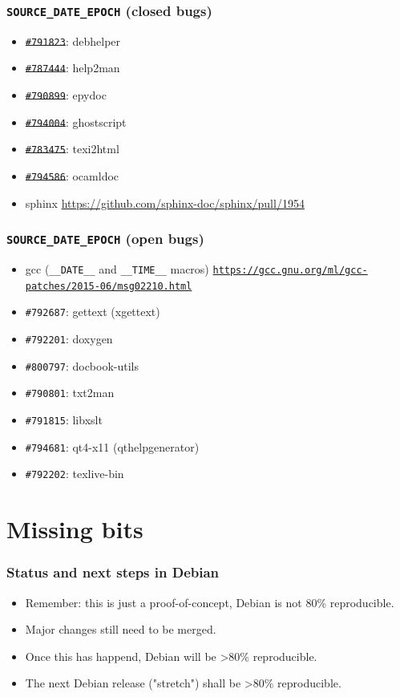 \documentclass[14pt]{beamer}
\begin{document}
\begin{frame}
 \frametitle{\texttt{SOURCE\_DATE\_EPOCH} (closed bugs)}

 \begin{itemize}
  \item \sout{\texttt{\#791823}}: debhelper
  \item \sout{\texttt{\#787444}}: help2man
  \item \sout{\texttt{\#790899}}: epydoc
  \item \sout{\texttt{\#794004}}: ghostscript
  \item \sout{\texttt{\#783475}}: texi2html
  \item \sout{\texttt{\#794586}}: ocamldoc
  \item sphinx \small{\url{https://github.com/sphinx-doc/sphinx/pull/1954}}
 \end{itemize}

\end{frame}

\begin{frame}
 \frametitle{\texttt{SOURCE\_DATE\_EPOCH} (open bugs)}

 \begin{itemize}
  \item gcc (\texttt{\_\_DATE\_\_} and \texttt{\_\_TIME\_\_} macros) \texttt{\footnotesize{\url{https://gcc.gnu.org/ml/gcc-patches/2015-06/msg02210.html}}}
  \item \texttt{\#792687}: gettext (xgettext)
  \item \texttt{\#792201}: doxygen
  \item \texttt{\#800797}: docbook-utils
  \item \texttt{\#790801}: txt2man
  \item \texttt{\#791815}: libxslt
  \item \texttt{\#794681}: qt4-x11 (qthelpgenerator)
  \item \texttt{\#792202}: texlive-bin
 \end{itemize}

\end{frame}


\section{Missing bits}

\begin{frame}
 \frametitle{Status and next steps in Debian}
 \begin{itemize}
  \item Remember: this is just a proof-of-concept, Debian is not 80\%
  reproducible.
  \item Major changes still need to be merged.
  \item Once this has happend, Debian will be >80\% reproducible.
  \item The next Debian release ("stretch") shall be >80\% reproducible.
 \end{itemize}
\end{frame}
\end{document}
